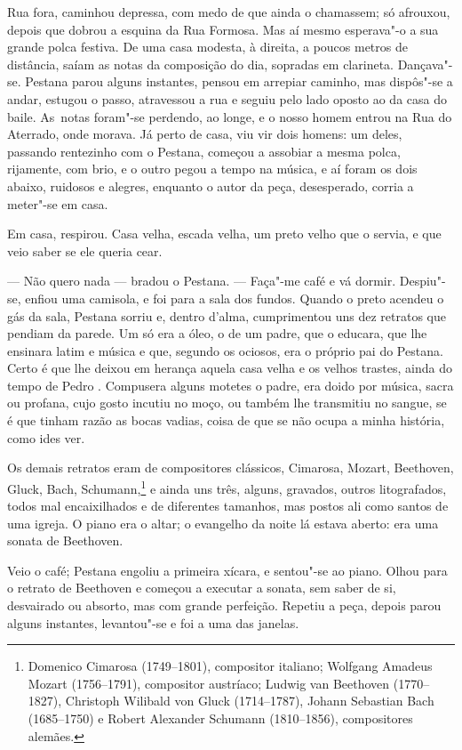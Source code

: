 \begin{linenumbers}
Rua fora, caminhou depressa, com medo de que ainda o chamassem; só
afrouxou, depois que dobrou a esquina da Rua Formosa. Mas aí mesmo
esperava"-o a sua grande polca festiva. De uma casa modesta, à direita, a
poucos metros de distância, saíam as notas da composição do dia,
sopradas em clarineta. Dançava"-se. Pestana parou alguns instantes,
pensou em arrepiar caminho, mas dispôs"-se a andar, estugou o passo,
atravessou a rua e seguiu pelo lado oposto ao da casa do baile. As~notas
foram"-se perdendo, ao longe, e o nosso homem entrou na Rua do Aterrado,
onde morava. Já perto de casa, viu vir dois homens: um deles, passando
rentezinho com o Pestana, começou a assobiar a mesma polca, rijamente,
com brio, e o outro pegou a tempo na música, e aí foram os dois abaixo,
ruidosos e alegres, enquanto o autor da peça, desesperado, corria a
meter"-se em casa.

Em casa, respirou. Casa velha, escada velha, um preto velho que o
servia, e que veio saber se ele queria cear.

--- Não quero nada --- bradou o Pestana. --- Faça"-me café e vá dormir.
Despiu"-se, enfiou uma camisola, e foi para a sala dos fundos. Quando o
preto acendeu o gás da sala, Pestana sorriu e, dentro d'alma,
cumprimentou uns dez retratos que pendiam da parede. Um só era a óleo, o
de um padre, que o educara, que lhe ensinara latim e música e que,
segundo os ociosos, era o próprio pai do Pestana. Certo é que lhe deixou
em herança aquela casa velha e os velhos trastes, ainda do tempo de
Pedro . Compusera alguns motetes o padre, era doido por música, sacra
ou profana, cujo gosto incutiu no moço, ou também lhe transmitiu no
sangue, se é que tinham razão as bocas vadias, coisa de que se não ocupa
a minha história, como ides ver.

Os demais retratos eram de compositores clássicos, Cimarosa, Mozart,
Beethoven, Gluck, Bach, Schumann,\footnote{Domenico Cimarosa (1749--1801),
  compositor italiano; Wolfgang Amadeus Mozart (1756--1791), compositor
  austríaco; Ludwig van Beethoven (1770--1827), Christoph Wilibald von
  Gluck (1714--1787), Johann Sebastian Bach (1685--1750) e Robert
  Alexander Schumann (1810--1856), compositores alemães.} e ainda uns
três, alguns, gravados, outros litografados, todos mal encaixilhados e
de diferentes tamanhos, mas postos ali como santos de uma igreja. O
piano era o altar; o evangelho da noite lá estava aberto: era uma sonata
de Beethoven.

Veio o café; Pestana engoliu a primeira xícara, e sentou"-se ao piano.
Olhou para o retrato de Beethoven e começou a executar a sonata, sem
saber de si, desvairado ou absorto, mas com grande perfeição. Repetiu a
peça, depois parou alguns instantes, levantou"-se e foi a uma das
janelas.


\end{linenumbers}
